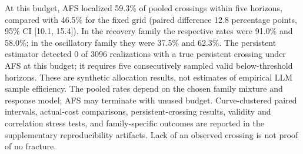 At this budget, AFS localized 59.3\% of pooled crossings within five horizons, compared with 46.5\% for the fixed grid (paired difference 12.8 percentage points, 95\% CI [10.1, 15.4]). In the recovery family the respective rates were 91.0\% and 58.0\%; in the oscillatory family they were 37.5\% and 62.3\%. The persistent estimator detected 0 of 3096 realizations with a true persistent crossing under AFS at this budget; it requires five consecutively sampled valid below-threshold horizons. These are synthetic allocation results, not estimates of empirical LLM sample efficiency. The pooled rates depend on the chosen family mixture and response model; AFS may terminate with unused budget. Curve-clustered paired intervals, actual-cost comparisons, persistent-crossing results, validity and correlation stress tests, and family-specific outcomes are reported in the supplementary reproducibility artifacts. Lack of an observed crossing is not proof of no fracture.
